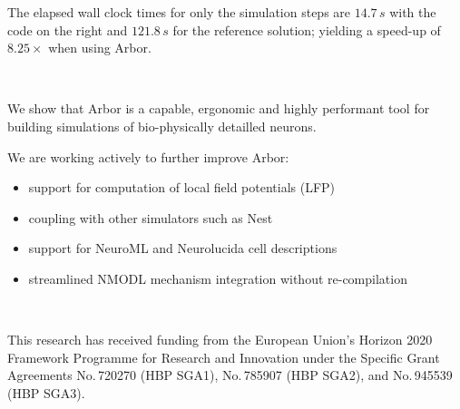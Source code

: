 \documentclass{beamer}
\begin{document}
\begin{frame}[t, fragile]
\begin{columns}[T]
\begin{column}{.49\linewidth}
      The elapsed wall clock times for only the simulation steps are $14.7\,s$
      with the code on the right and $121.8\,s$ for the reference solution;
      yielding a speed-up of $8.25\times$ when using Arbor.
    \end{column}
    \begin{column}{.49\linewidth}
      \inputminted[bgcolor=lightgray,escapeinside=!!]{python}{src/model.py}
    \end{column}
  \end{columns}
  \begin{columns}[T]
    \begin{column}{.49\linewidth}
      \textbf{}\\
      We show that Arbor is a capable, ergonomic and highly
      performant tool for building simulations of bio-physically detailled
      neurons.

      We are working actively to further improve Arbor:
      \begin{itemize}
        \item support for computation of local field potentials (LFP)
        \item coupling with other simulators such as Nest
        \item support for NeuroML and Neurolucida cell descriptions
        \item streamlined NMODL mechanism integration without re-compilation
      \end{itemize}
    \end{column}
    \begin{column}{.49\linewidth}
      \textbf{}\\
      \printbibliography{}
    \end{column}
  \end{columns}

      \textbf{}\\
      This research has received funding from the European Union's Horizon 2020
      Framework Programme for Research and Innovation under the Specific Grant
      Agreements No.\,720270 (HBP SGA1), No.\,785907 (HBP SGA2), and No.\,945539
      (HBP SGA3).\\[1.5ex]
\end{frame}
\end{document}
